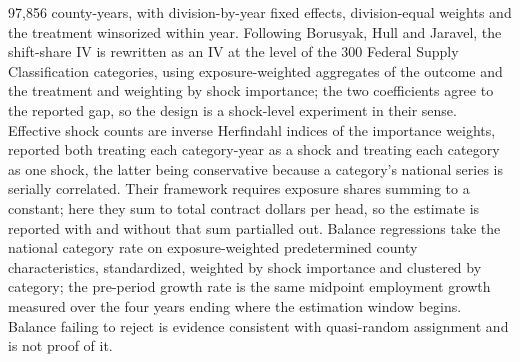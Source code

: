 \begin{table}[!htbp]
{97,856 county-years, with division-by-year fixed effects, division-equal weights and the
treatment winsorized within year. Following Borusyak, Hull and Jaravel, the shift-share IV is
rewritten as an IV at the level of the 300 Federal Supply Classification categories,
using exposure-weighted aggregates of the outcome and the treatment and weighting by shock
importance; the two coefficients agree to the reported gap, so the design is a shock-level
experiment in their sense. Effective shock counts are inverse Herfindahl indices of the
importance weights, reported both treating each category-year as a shock and treating each
category as one shock, the latter being conservative because a category's national series is
serially correlated. Their framework requires exposure shares summing to a constant; here they
sum to total contract dollars per head, so the estimate is reported with and without that sum
partialled out. Balance regressions take the national category rate on exposure-weighted
predetermined county characteristics, standardized, weighted by shock importance and clustered
by category; the pre-period growth rate is the same midpoint employment growth measured over
the four years ending where the estimation window begins. Balance failing to reject is evidence
consistent with quasi-random assignment and is not proof of it.\par}
\end{table}
